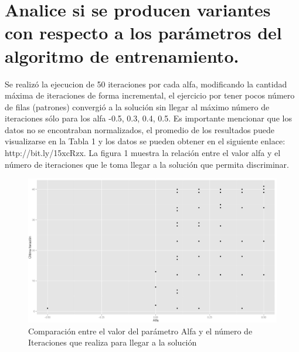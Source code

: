 \documentclass[8.5pt,twoside,twocolumn]{article}
\begin{document}
\section{Analice si se producen variantes con respecto a los par\'ametros del algoritmo de entrenamiento.}
      
        Se realiz\'o la ejecucion de 50 iteraciones por cada alfa, modificando la cantidad m\'axima de iteraciones
        de forma incremental, el ejercicio por tener pocos n\'umero de filas (patrones) convergi\'o a la soluci\'on
 sin llegar al m\'aximo n\'umero de iteraciones s\'olo para los alfa -0.5, 0.3, 0.4, 0.5. Es importante mencionar que 
los datos no se encontraban normalizados, el promedio de los resultados puede visualizarse en la Tabla 1 y los 
datos se pueden obtener en el siguiente enlace: http://bit.ly/15xcRzx. La figura 1 muestra la relaci\'on entre el valor
alfa y el n\'umero de iteraciones que le toma llegar a la soluci\'on que permita discriminar.

 	\begin{figure}[h]
	  \centering
	  \includegraphics[scale=0.2]{clima_alfa_iteracion1a.png}
	  \caption{Comparaci\'on entre el valor del par\'ametro Alfa y el n\'umero de Iteraciones que realiza para llegar a la soluci\'on}
	  \label{fgr:alfaIteracion}
	\end{figure}
\end{document}
